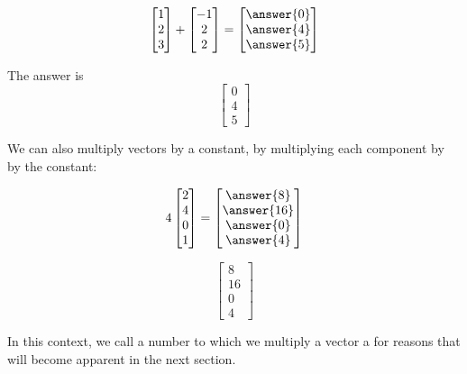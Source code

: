 \documentclass{ximera}
\begin{document}
\begin{question}
  \[
  \begin{bmatrix} 1 \\ 2 \\3  \end{bmatrix}+ \begin{bmatrix} -1\\ 2 \\ 2  \end{bmatrix} = \begin{bmatrix} \answer{0} \\ \answer{4} \\ \answer{5}  \end{bmatrix}
  \]
  \begin{hint}
    The answer is  
    \[
    \begin{bmatrix} 0 \\ 4 \\ 5 \end{bmatrix}
    \]
  \end{hint}
\end{question}

We can also multiply vectors by a constant, by multiplying each component by by the constant:

\begin{question}

\[
4\begin{bmatrix} 2 \\ 4 \\ 0  \\ 1 \end{bmatrix} = \begin{bmatrix} \answer{8}\\ \answer{16} \\ \answer{0}  \\ \answer{4} \end{bmatrix} 
\]	

\begin{hint}
\[
 \begin{bmatrix} 8 \\ 16 \\ 0  \\ 4 \end{bmatrix} 
 \]
\end{hint}
\end{question}

In this context, we call a number to which we multiply a vector a  for reasons that will become apparent in the next section.
\end{document}
